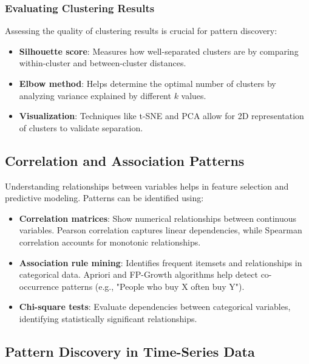 \documentclass[12pt,openany]{book}
\begin{document}
\subsubsection{Evaluating Clustering Results}

Assessing the quality of clustering results is crucial for pattern discovery:
\begin{itemize}
    \item \textbf{Silhouette score}: Measures how well-separated clusters are by comparing within-cluster and between-cluster distances.
    \item \textbf{Elbow method}: Helps determine the optimal number of clusters by analyzing variance explained by different \( k \) values.
    \item \textbf{Visualization}: Techniques like t-SNE and PCA allow for 2D representation of clusters to validate separation.
\end{itemize}


\subsection{Correlation and Association Patterns}

Understanding relationships between variables helps in feature selection and predictive modeling. Patterns can be identified using:
\begin{itemize}
    \item \textbf{Correlation matrices}: Show numerical relationships between continuous variables. Pearson correlation captures linear dependencies, while Spearman correlation accounts for monotonic relationships.
    \item \textbf{Association rule mining}: Identifies frequent itemsets and relationships in categorical data. Apriori and FP-Growth algorithms help detect co-occurrence patterns (e.g., "People who buy X often buy Y").
    \item \textbf{Chi-square tests}: Evaluate dependencies between categorical variables, identifying statistically significant relationships.
\end{itemize}


\subsection{Pattern Discovery in Time-Series Data}
\end{document}
